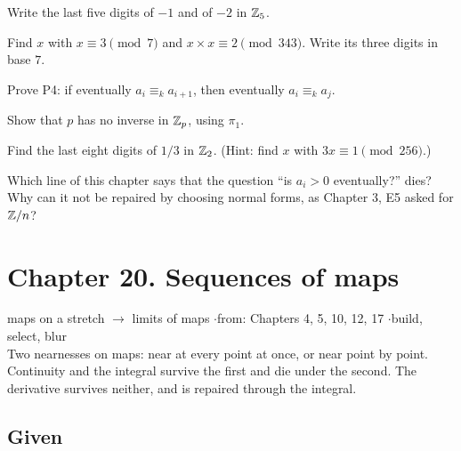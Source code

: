 \begin{lines}
\item[\lab{E1}] Write the last five digits of $-1$ and of $-2$ in $\mathbb{Z}_5$.
\item[\lab{E2}] Find $x$ with $x \equiv 3 \pmod 7$ and $x \times x \equiv 2 \pmod{343}$. Write its three digits in base $7$.
\item[\lab{E3}] Prove P4: if eventually $a_i \equiv_k a_{i+1}$, then eventually $a_i \equiv_k a_j$.
\item[\lab{E4}] Show that $p$ has no inverse in $\mathbb{Z}_p$, using $\pi_1$.
\item[\lab{E5}] Find the last eight digits of $1/3$ in $\mathbb{Z}_2$. (Hint: find $x$ with $3x \equiv 1 \pmod{256}$.)
\item[\lab{E6}] Which line of this chapter says that the question ``is $a_i > 0$ eventually?'' dies? Why can it not be repaired by choosing normal forms, as Chapter 3, E5 asked for $\mathbb{Z}/n$?
\end{lines}

\newpage

\section*{Chapter 20. Sequences of maps}
\begin{center}
{\normalsize maps on a stretch $\to$ limits of maps \quad$\cdot$\quad from: Chapters 4, 5, 10, 12, 17 \quad$\cdot$\quad build, select, blur}\\[4pt]
{\small Two nearnesses on maps: near at every point at once, or near point by point. Continuity and the integral survive the first and die under the second. The derivative survives neither, and is repaired through the integral.}
\end{center}

\subsection*{Given}


